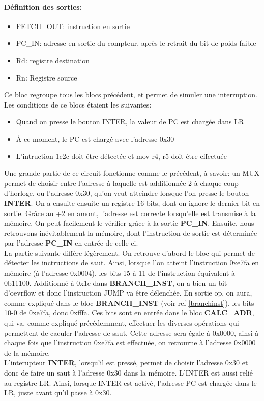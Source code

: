 \documentclass[a4paper]{article} %
\begin{document}
\paragraph{Définition des sorties:}
\begin{itemize}
    \item FETCH\_OUT: instruction en sortie
    \item PC\_IN: adresse en sortie du compteur, après le retrait du bit de poids faible
    \item Rd: registre destination
    \item Rn: Registre source
\end{itemize}
\medskip
Ce bloc regroupe tous les blocs précédent, et permet de simuler une interruption. Les conditions de ce blocs étaient les suivantes:
\begin{itemize}
   \item Quand on presse le bouton INTER, la valeur de PC est chargée dans LR
   \item À ce moment, le PC est chargé avec l'adresse 0x30
   \item L'intruction 1c2c doit être détectée et mov r4, r5 doit être effectuée
\end{itemize}
\medskip
Une grande partie de ce circuit fonctionne comme le précédent, à savoir: un MUX permet de choisir entre l'adresse à laquelle est additionnée 2 à chaque coup d'horloge, ou l'adresse 0x30, qu'on veut atteindre lorsque l'on presse le bouton \textbf{INTER}. On a ensuite ensuite un registre 16 bits, dont on ignore le dernier bit en sortie. Grâce au +2 en amont, l'adresse est correcte lorsqu'elle est transmise à la mémoire. On peut facilement le vérifier grâce à la sortie \textbf{PC\_IN}. Ensuite, nous retrouvons inévitablement la mémoire, dont l'instruction de sortie est déterminée par l'adresse \textbf{PC\_IN} en entrée de celle-ci.\medskip \\

La partie suivante diffère légèrement. On retrouve d'abord le bloc  qui permet de détecter les inctructions de saut. Ainsi, lorsque l'on atteint l'instruction 0xe7fa en mémoire (à l'adresse 0x0004), les bits 15 à 11 de l'instruction équivalent à 0b11100. Additionné à 0x1c dans \textbf{BRANCH\_INST}, on a bien un bit d'oevrflow et donc l'instruction JUMP va être délenchée. En sortie op, on aura, comme expliqué dans le bloc \textbf{BRANCH\_INST} (voir ref \ref{branchinst}), les bits 10-0 de 0xe7fa, donc 0xfffa. Ces bits sont en entrée dans le bloc \textbf{CALC\_ADR}, qui va, comme expliqué précédemment, effectuer les diverses opérations qui permettent de caculer l'adresse de saut. Cette adresse sera égale à 0x0000, ainsi à chaque fois que l'instruction 0xe7fa est effectuée, on retrourne à l'adresse 0x0000 de la mémoire.\\
L'interupteur \textbf{INTER}, lorsqu'il est pressé, permet de choisir l'adresse 0x30 et donc de faire un saut à l'adresse 0x30 dans la mémoire. L'INTER est aussi relié au registre LR. Ainsi, lorsque INTER est activé, l'adresse PC est chargée dans le LR, juste avant qu'il passe à 0x30.\medskip \\
\end{document}
